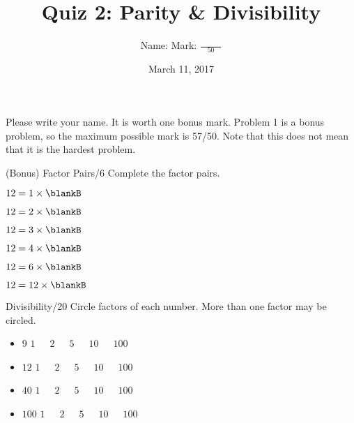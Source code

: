 \documentclass[12pt,letterpaper]{article}
\title{Quiz 2: Parity \& Divisibility}
\author{Name: \underline{\hspace{5cm}} Mark: $\displaystyle \frac{\hspace{3em}}{50}$}
\date{March 11, 2017}
\begin{document}
\maketitle

Please write your name. It is worth one bonus mark. Problem 1 is a bonus
problem, so the maximum possible mark is 57/50. Note that this does not mean
that it is the hardest problem.

\thispagestyle{empty}

\begin{problem}{(Bonus) Factor Pairs\hfill/6}
 Complete the factor pairs.

 \begin{itemize}
  \begin{multicols}{2}
   \item $12 = 1 \times \blankB$
   \item $12 = 2 \times \blankB$
   \item $12 = 3 \times \blankB$
   \item $12 = 4 \times \blankB$
   \item $12 = 6 \times \blankB$
   \item $12 = 12 \times \blankB$
  \end{multicols}
 \end{itemize}

\end{problem}

\begin{problem}{Divisibility\hfill/20}
 Circle factors of each number. More than one factor may be circled.

 \begin{itemize}
  \item $9$ \hfill $1$~~~$2$~~~$5$~~~$10$~~~$100$
  \item $12$ \hfill $1$~~~$2$~~~$5$~~~$10$~~~$100$
  \item $40$ \hfill $1$~~~$2$~~~$5$~~~$10$~~~$100$
  \item $100$ \hfill $1$~~~$2$~~~$5$~~~$10$~~~$100$
 \end{itemize}
\end{problem}
\end{document}

